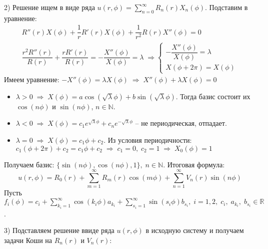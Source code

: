 \begin{solution}
	2) Решение ищем в виде ряда $u(r, \phi) = \sum \limits_{n = 0}^{\infty} R_n(r) X_n(\phi)$. Подставим в уравнение:
	$$\begin{gathered}
		R''(r)X(\phi) + \dfrac{1}{r}R'(r)X(\phi) + \dfrac{1}{r^2}R(r)X''(\phi) = 0 \\
		\dfrac{r^2 R''(r)}{R(r)} + \dfrac{r R'(r)}{R(r)} = -\dfrac{X''(\phi)}{X(\phi)} = \lambda \; \Rightarrow 
		\begin{cases}
			-\dfrac{X''(\phi)}{X(\phi)} = \lambda \\
			X(\phi + 2 \pi) = X(\phi)
		\end{cases} 
	\end{gathered}$$
	Имеем уравнение: $-X''(\phi) = \lambda X(\phi) \; \Rightarrow \; X''(\phi) + \lambda X(\phi) = 0$
	\begin{itemize}
	\item 
		$ \lambda > 0 \; \Rightarrow \;   X(\phi) = a\cos(\sqrt{\lambda}\phi) + b\sin(\sqrt{\lambda}\phi)$. Тогда базис состоит их $\cos(n\phi)$ и $\sin(n\phi)$, $n \in \mathbb{N}$.
	\item 
		$ \lambda < 0 \; \Rightarrow \;   X(\phi) = c_1 e^{\sqrt{\lambda}\phi} + c_n e^{-\sqrt{\lambda}\phi} $ -- не периодическая, отпадает.
	\item 
		$ \lambda = 0 \; \Rightarrow \; X(\phi) = c_1 \phi + c_2$. Из условия периодичности: $c_1 (\phi + 2\pi) + c_2 = c_1 \phi + c_2 \; \Rightarrow \; c_1 = 0, \; c_2 = 1 \; \Rightarrow \;  X_0(\phi) = 1 $
	\end{itemize}
	Получаем базис: $\{\sin(n \phi), \cos(n \phi), 1\}, \; n \in \mathbb{N}$. Итоговая формула:
	$$u(r, \phi) = R_0(r) + \sum \limits_{m = 1}^{\infty} R_m(r) \cos(m \phi) + \sum \limits_{n = 1}^{\infty} V_n (r) \sin(n \phi)$$
	Пусть $f_i(\phi) = c_i + \sum\limits_{k_i = 1}^\infty \cos(k_i \phi) a_{k_i} + \sum\limits_{s_i = 1}^\infty\sin(s_i \phi) b_{s_i}, \; i = 1, 2, \; c_i, \; a_{k_i}, \; b_{s_i} \in \mathbb{R}$.

	3) Подставляем решение ввиде ряда $u(r, \phi)$ в исходную систему и получаем задачи Коши на $R_n(r)$ и $V_n(r)$:


\end{solution}
